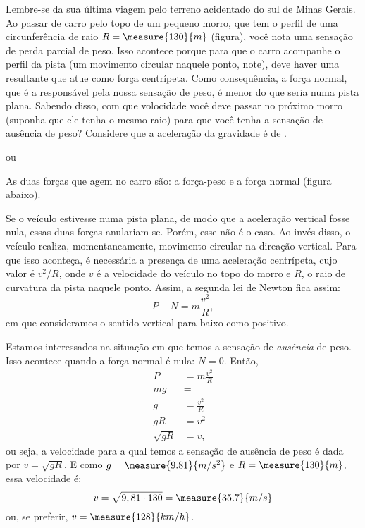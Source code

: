 \begin{question}
	Lembre-se da sua última viagem pelo terreno acidentado do sul de Minas Gerais.
	Ao passar de carro pelo topo de um pequeno morro, que tem o perfil de uma circunferência de raio $R = \measure{130}{m}$ (figura), você nota uma sensação de perda parcial de peso.
	Isso acontece porque para que o carro acompanhe o perfil da pista (um movimento circular naquele ponto, note), deve haver uma resultante que atue como força centrípeta.
	Como consequência, a força normal, que é a responsável pela nossa sensação de peso, é menor do que seria numa pista plana.
	Sabendo disso, com que volocidade você deve passar no próximo morro (suponha que ele tenha o mesmo raio) para que você tenha a sensação de ausência de peso?
	Considere que a aceleração da gravidade é de .


	\begin{answer}
		 ou 
	\end{answer}

	\begin{solution}
		As duas forças que agem no carro são: a força-peso e a força normal (figura abaixo).


		Se o veículo estivesse numa pista plana, de modo que a aceleração vertical fosse nula, essas duas forças anulariam-se.
		Porém, esse não é o caso.
		Ao invés disso, o veículo realiza, momentaneamente, movimento circular na direação vertical.
		Para que isso aconteça, é necessária a presença de uma aceleração centrípeta, cujo valor é $v^2/R$, onde $v$ é a velocidade do veículo no topo do morro e $R$, o raio de curvatura da pista naquele ponto.
		Assim, a segunda lei de Newton fica assim:
		\begin{equation*}
			P - N = m\frac{v^2}{R},
		\end{equation*}
		em que consideramos o sentido vertical para baixo como positivo.

		Estamos interessados na situação em que temos a sensação de \emph{ausência} de peso.
		Isso acontece quando a força normal é nula: $N = 0$.
		Então,
		\begin{align*}
			P  &= m\frac{v^2}{R} \\
			mg &= \\
			g  &= \frac{v^2}{R} \\
			gR &= v^2 \\
			\sqrt{gR} &= v,
		\end{align*}
		ou seja, a velocidade para a qual temos a sensação de ausência de peso é dada por $v = \sqrt{gR}$.
		E como $g = \measure{9.81}{m/s^2}$ e $R = \measure{130}{m}$, essa velocidade é:
		\begin{equation*}
			v = \sqrt{9,81 \cdot 130} = \measure{35.7}{m/s}
		\end{equation*}
		ou, se preferir, $v = \measure{128}{km/h}$.
	\end{solution}
\end{question}